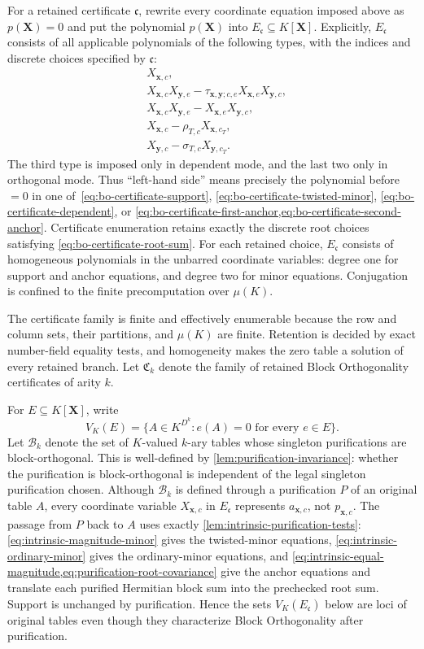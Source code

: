 \documentclass[11pt]{article}
\theoremstyle{plain}
\theoremstyle{definition}
\theoremstyle{remark}
\begin{document}
For a retained certificate $\mathfrak c$, rewrite every coordinate equation
imposed above as $p(\mathbf X)=0$ and put the polynomial
$p(\mathbf X)$ into $E_{\mathfrak c}\subseteq K[\mathbf X]$.  Explicitly,
$E_{\mathfrak c}$ consists of all applicable polynomials of the following
types, with the indices and discrete choices specified by
$\mathfrak c$:
\begin{align*}
  &X_{\mathbf x,c},\\
  &X_{\mathbf x,c}X_{\mathbf y,e}
    -\tau_{\mathbf x,\mathbf y;c,e}
     X_{\mathbf x,e}X_{\mathbf y,c},\\
  &X_{\mathbf x,c}X_{\mathbf y,e}
    -X_{\mathbf x,e}X_{\mathbf y,c},\\
  &X_{\mathbf x,c}-\rho_{T,c}X_{\mathbf x,c_T},\\
  &X_{\mathbf y,c}-\sigma_{T,c}X_{\mathbf y,c_T}.
\end{align*}
The third type is imposed only in dependent mode, and the last two only in
orthogonal mode.
Thus ``left-hand side'' means precisely the polynomial before $=0$ in one
of~\eqref{eq:bo-certificate-support},
\eqref{eq:bo-certificate-twisted-minor},
\eqref{eq:bo-certificate-dependent}, or
\cref{eq:bo-certificate-first-anchor,eq:bo-certificate-second-anchor}.
Certificate enumeration retains exactly the discrete root choices satisfying
\eqref{eq:bo-certificate-root-sum}.  For each retained choice,
$E_{\mathfrak c}$ consists of homogeneous polynomials in the unbarred
coordinate variables: degree one for support and anchor equations, and degree
two for minor equations.  Conjugation is confined to the finite
precomputation over $\mu(K)$.

The certificate family is finite and effectively enumerable because the row
and column sets, their partitions, and $\mu(K)$ are finite.  Retention is
decided by exact number-field equality tests, and homogeneity makes the zero
table a solution of every retained branch.  Let $\mathfrak C_k$ denote the
family of retained Block Orthogonality certificates of arity $k$.

For $E\subseteq K[\mathbf X]$, write
\[
  V_K(E)=\{A\in K^{D^k}:e(A)=0\text{ for every }e\in E\}.
\]
Let $\mathcal B_k$ denote the set of $K$-valued $k$-ary tables whose
singleton purifications are block-orthogonal.  This is well-defined by
\cref{lem:purification-invariance}: whether the purification is
block-orthogonal is independent of the legal singleton purification chosen.
Although $\mathcal B_k$ is defined through a purification $P$ of an original
table $A$, every coordinate variable $X_{\mathbf x,c}$ in
$E_{\mathfrak c}$ represents $a_{\mathbf x,c}$, not
$p_{\mathbf x,c}$.  The passage from $P$ back to $A$ uses exactly
\cref{lem:intrinsic-purification-tests}:
\eqref{eq:intrinsic-magnitude-minor} gives the twisted-minor equations,
\eqref{eq:intrinsic-ordinary-minor} gives the ordinary-minor equations, and
\cref{eq:intrinsic-equal-magnitude,eq:purification-root-covariance} give
the anchor equations and translate each purified Hermitian block sum into
the prechecked root sum.  Support is unchanged by purification.  Hence the
sets $V_K(E_{\mathfrak c})$ below are loci of original tables even though
they characterize Block Orthogonality after purification.
\end{document}
